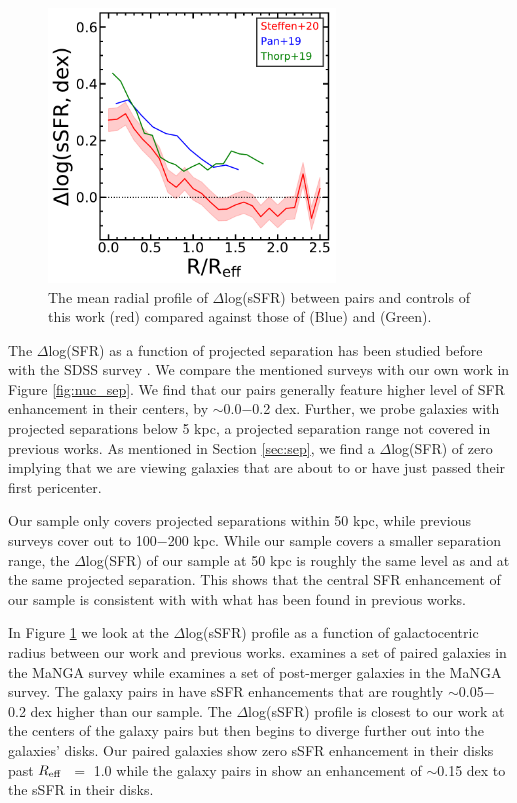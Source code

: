 \documentclass[iop,revtex4,twocolumn,apj,numberedappendix,appendixfloats]{emulateapj}
\newcommand{\reff}{$R_{\rm eff}$}
\begin{document}
\begin{figure}
\centering
\includegraphics[width=3in]{fig/prof_comp.pdf}
\caption[]{The mean radial profile of $\Delta$log(sSFR) between pairs and controls of this work (red) compared against those of \citet{Pan:2019} (Blue) and \citet{Thorp:2019} (Green).}
\label{fig:prof_comp}
\end{figure}

The $\Delta$log(SFR) as a function of projected separation has been studied before with the SDSS survey \citep{Ellison:2008, Patton:2013, Scudder:2012, Bustamante:2020}. We compare the mentioned surveys with our own work in Figure \ref{fig:nuc_sep}. We find that our pairs generally feature higher level of SFR enhancement in their centers, by $\sim$0.0$-$0.2 dex. Further, we probe galaxies with projected separations below 5 kpc, a projected separation range not covered in previous works. As mentioned in Section \ref{sec:sep}, we find a $\Delta$log(SFR) of zero implying that we are viewing galaxies that are about to or have just passed their first pericenter. 

Our sample only covers projected separations within 50 kpc, while previous surveys cover out to 100$-$200 kpc. While our sample covers a smaller separation range, the $\Delta$log(SFR) of our sample at 50 kpc is roughly the same level as \citet{Scudder:2012} and \citet{Patton:2013} at the same projected separation. This shows that the central SFR enhancement of our sample is consistent with with what has been found in previous works. 

In Figure \ref{fig:prof_comp} we look at the $\Delta$log(sSFR) profile as a function of galactocentric radius between our work and previous works. \citet{Pan:2019} examines a set of paired galaxies in the MaNGA survey while \citet{Thorp:2019} examines a set of post-merger galaxies in the MaNGA survey. The galaxy pairs in \citet{Pan:2019} have sSFR enhancements that are roughtly $\sim$0.05$-$0.2 dex higher than our sample. The $\Delta$log(sSFR) profile is closest to our work at the centers of the galaxy pairs but then begins to diverge further out into the galaxies' disks. Our paired galaxies show zero sSFR enhancement in their disks past \reff\ $=$ 1.0 while the galaxy pairs in \citet{Pan:2019} show an enhancement of $\sim$0.15 dex to the sSFR in their disks. 
\end{document}
